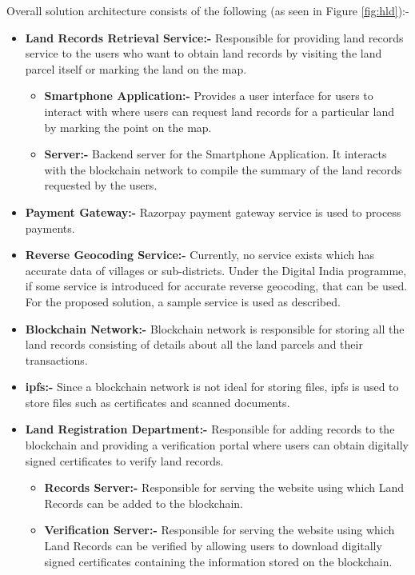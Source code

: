 \documentclass[12pt]{article}
\begin{document}
    Overall solution architecture consists of the following (as seen in Figure \ref{fig:hld}):-
    \begin{itemize}
        \item \textbf{Land Records Retrieval Service:-} Responsible for providing land records service to the users who want to obtain land records by visiting the land parcel itself or marking the land on the map.
        \begin{itemize}
            \item \textbf{Smartphone Application:-} Provides a user interface for users to interact with where users can request land records for a particular land by marking the point on the map.
            \item \textbf{Server:-} Backend server for the Smartphone Application. It interacts with the blockchain network to compile the summary of the land records requested by the users.
        \end{itemize}
        \item \textbf{Payment Gateway:-} Razorpay payment gateway service is used to process payments.
        \item \textbf{Reverse Geocoding Service:-} Currently, no service exists which has accurate data of villages or sub-districts. Under the Digital India programme, if some service is introduced for accurate reverse geocoding, that can be used. For the proposed solution, a sample service is used as described.
        \item \textbf{Blockchain Network:-} Blockchain network is responsible for storing all the land records consisting of details about all the land parcels and their transactions.
        \item \textbf{\acrshort{ipfs}:-} Since a blockchain network is not ideal for storing files, \acrshort{ipfs} is used to store files such as certificates and scanned documents.
        \item \textbf{Land Registration Department:-} Responsible for adding records to the blockchain and providing a verification portal where users can obtain digitally signed certificates to verify land records.
        \begin{itemize}
            \item \textbf{Records Server:-} Responsible for serving the website using which Land Records can be added to the blockchain.
            \item \textbf{Verification Server:-} Responsible for serving the website using which Land Records can be verified by allowing users to download digitally signed certificates containing the information stored on the blockchain.
        \end{itemize}  
    \end{itemize}
\end{document}
